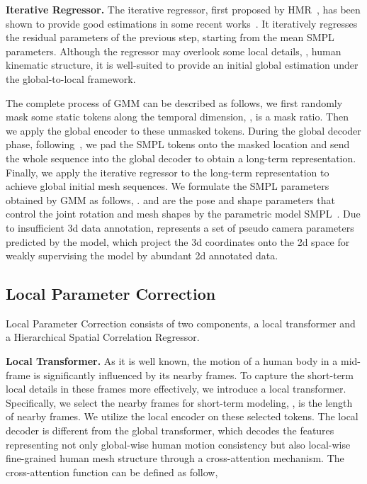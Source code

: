 \documentclass[10pt,twocolumn,letterpaper]{article}
\begin{document}
	\noindent\textbf{Iterative Regressor.}
	The iterative regressor, first proposed by HMR~\cite{HMR}, has been shown to provide good estimations in some recent works~\cite{VIBE, TCMR, MPS-net}. It iteratively regresses the residual parameters of the previous step, starting from the mean SMPL parameters.
	Although the regressor may overlook some local details, \eg, human kinematic structure, it is well-suited to provide an initial global estimation under the global-to-local framework.
	
	The complete process of GMM can be described as follows, we first randomly mask some static tokens along the temporal dimension, ,  is a mask ratio. Then we apply the global encoder to these unmasked tokens. During the global decoder phase, following~\cite{MAE}, we pad the SMPL tokens onto the masked location and send the whole sequence into the global decoder to obtain a long-term representation. Finally, we apply the iterative regressor to the long-term representation to achieve global initial mesh sequences. We formulate the SMPL parameters obtained by GMM as follows,  .  and  are the pose and shape parameters that control the joint rotation and mesh shapes by the parametric model SMPL~\cite{SMPL}. 
	Due to insufficient 3d data annotation,  represents a set of pseudo camera parameters predicted by the model, which project the 3d coordinates onto the 2d space for weakly supervising the model by abundant 2d annotated data.
	




	\subsection{Local Parameter Correction}
	
	Local Parameter Correction consists of two components, \ie a local transformer and a Hierarchical Spatial Correlation Regressor. 
	
	\noindent\textbf{Local Transformer.}
	As it is well known, the motion of a human body in a mid-frame is significantly influenced by its nearby frames. To capture the short-term local details in these frames more effectively, we introduce a local transformer.
	Specifically, we select the nearby frames for short-term modeling, ,  is the length of nearby frames. We utilize the local encoder on these selected tokens. 
	The local decoder is different from the global transformer, which decodes the features representing not only global-wise human motion consistency but also local-wise fine-grained human mesh structure through a cross-attention mechanism. The cross-attention function can be defined as follow,
	
\end{document}
